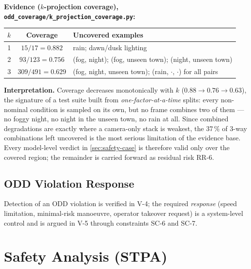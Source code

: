 \documentclass[a4paper,12pt]{article}
\begin{document}
\begin{mdframed}[style=evidencestyle]
\textbf{Evidence ($k$-projection coverage), \texttt{odd\_coverage/k\_projection\_coverage.py}:}\\

\begin{center}
\small
\begin{tabular}{@{}ccp{8.4cm}@{}}
\toprule
\textbf{$k$} & \textbf{Coverage} & \textbf{Uncovered examples} \\
\midrule
1 & $15/17 = 0.882$   & rain; dawn/dusk lighting \\
2 & $93/123 = 0.756$  & (fog, night); (fog, unseen town); (night, unseen town) \\
3 & $309/491 = 0.629$ & (fog, night, unseen town); (rain, $\cdot$, $\cdot$) for all pairs \\
\bottomrule
\end{tabular}
\end{center}
\end{mdframed}

\noindent\textbf{Interpretation.} Coverage decreases monotonically with $k$
($0.88 \rightarrow 0.76 \rightarrow 0.63$), the signature of a test suite built from
\emph{one-factor-at-a-time} splits: every non-nominal condition is sampled on its own, but
no frame combines two of them --- no foggy night, no night in the unseen town, no rain at
all. Since combined degradations are exactly where a camera-only stack is weakest, the
37\,\% of 3-way combinations left uncovered is the most serious limitation of the evidence
base. Every model-level verdict in \cref{sec:safety-case} is therefore valid only over the
covered region; the remainder is carried forward as residual risk RR-6.

\subsection{ODD Violation Response}

Detection of an ODD violation is verified in V-4; the required \emph{response} (speed
limitation, minimal-risk manoeuvre, operator takeover request) is a system-level control
and is argued in V-5 through constraints SC-6 and SC-7.



\section{Safety Analysis (STPA)}
\label{sec:stpa}
\end{document}
